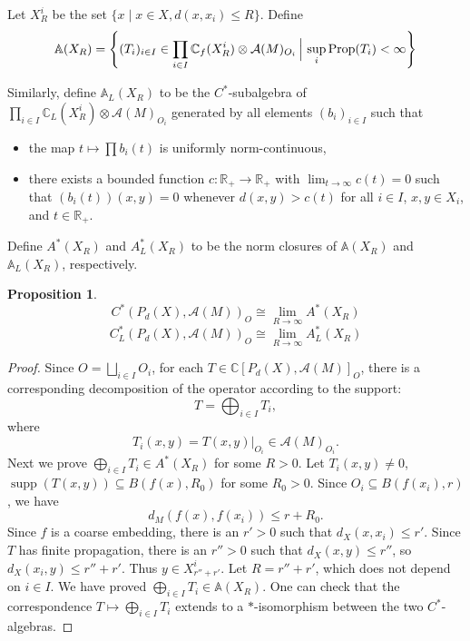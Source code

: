 \documentclass{article}
\theoremstyle{plain}
\newtheorem{proposition}[theorem]{Proposition}
\theoremstyle{definition}
\theoremstyle{remark}
\begin{document}
	Let $X_R^{i}$ be the set $\{x\mid x\in X, d(x,x_i)\leq R\}$. Define
	$$\mathbb{A}(X_R)=\left\{(T_i)_{i\in I}\in\prod_{i\in I}\mathbb{C}_f(X_R^{i})\otimes\mathcal A(M)_{O_{i}} \,\Big|\, \sup_i \textup{Prop}(T_i)< \infty\right\}$$
	
	Similarly, define $\mathbb{A}_L(X_R)$ to be the $C^*$-subalgebra of $\prod_{i\in I}\mathbb{C}_L(X_R^{i})\otimes\mathcal A(M)_{O_{i}}$ generated by all elements $(b_i)_{i\in I}$ such that
	\begin{itemize}
		\item[(1)] the map $t\mapsto\prod b_i(t)$ is uniformly norm-continuous,
		\item[(2)] there exists a bounded function $c:\mathbb R_+\to\mathbb R_+$ with $\lim_{t\to\infty}c(t)=0$ such that $(b_i(t))(x,y)=0$ whenever $d(x,y)>c(t)$ for all $i\in I$, $x,y\in X_i$, and $t\in\mathbb R_+$.
	\end{itemize}
	Define $A^*(X_R)$ and $A_L^*(X_R)$ to be the norm closures of $\mathbb{A}(X_R)$ and $\mathbb{A}_L(X_R)$, respectively.
	\begin{proposition}\label{sliceiso}
		$$C^*(P_d(X),\mathcal A(M))_O\cong\lim\limits_{R\to\infty}A^*(X_R)$$
		$$C_{L}^*(P_d(X),\mathcal A(M))_O\cong\lim\limits_{R\to\infty}A_L^*(X_R)$$
	\end{proposition}
	\begin{proof}
		Since $O=\bigsqcup_{i\in I}O_{i}$, for each $T\in \mathbb{C}[P_d(X),\mathcal A(M)]_{O}$, there is a corresponding decomposition of the operator according to the support:
		$$T=\bigoplus_{i\in I}T_{i},$$
		where
		$$T_{i}(x,y)=T(x,y)|_{O_{i}}\in\mathcal A(M)_{O_{i}}.$$
		Next we prove $\bigoplus_{i\in I}T_{i}\in A^*(X_R)$ for some $R>0$. Let $T_{i}(x,y)\neq 0$, $\operatorname{supp}(T(x,y))
		\subseteq B(f(x),R_0)$ for some $R_0>0$. Since $O_{i}\subseteq B(f(x_i),r)$, we have 
		$$d_{M}(f(x),f(x_i))\leq r+R_0.$$
		Since $f$ is a coarse embedding, there is an $r'>0$ such that $d_{X}(x,x_i)\leq r'$. Since $T$ has finite propagation, there is an $r'' > 0$ such that $d_{X}(x,y)\leq r''$, so $d_{X}(x_i,y)\leq r''+r'$. Thus $y\in X^i_{r''+r'}$. Let $R=r''+r'$, which does not depend on $i\in I$. We have proved $\bigoplus_{i\in I}T_{i}\in \mathbb{A}(X_R)$. 
		One can check that the correspondence $T\mapsto\bigoplus_{i\in I}T_{i}$ extends to a $*$-isomorphism between the two $C^*$-algebras. 
	\end{proof}
	
\end{document}
